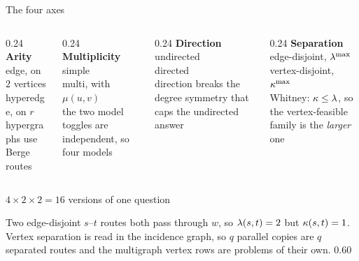 \documentclass[aspectratio=1610,11pt]{beamer}
\begin{document}
\begin{frame}{The four axes}
\vfill
\begin{columns}[T]
\begin{column}{0.24\textwidth}
  {\color{KULblauw1}\bfseries\large Arity}\\[8pt]
  {\small edge, on $2$ vertices}\\
  {\small hyperedge, on $r$}\\[10pt]
  {\scriptsize\color{black!55} hypergraphs use Berge routes}
\end{column}
\begin{column}{0.24\textwidth}
  {\color{KULblauw1}\bfseries\large Multiplicity}\\[8pt]
  {\small simple}\\
  {\small multi, with $\mu(u,v)$}\\[10pt]
  {\scriptsize\color{black!55} the two model toggles are independent, so four models}
\end{column}
\begin{column}{0.24\textwidth}
  {\color{KULblauw1}\bfseries\large Direction}\\[8pt]
  {\small undirected}\\
  {\small directed}\\[10pt]
  {\scriptsize\color{black!55} direction breaks the degree symmetry that caps the undirected answer}
\end{column}
\begin{column}{0.24\textwidth}
  {\color{KULblauw1}\bfseries\large Separation}\\[8pt]
  {\small edge-disjoint, $\lambda^{\max}$}\\
  {\small vertex-disjoint, $\kappa^{\max}$}\\[10pt]
  {\scriptsize\color{black!55} Whitney: $\kappa\le\lambda$, so the vertex-feasible family is the \emph{larger} one}
\end{column}
\end{columns}

\vspace{20pt}
\centering
{\color{KULblauw3b}\large $4 \times 2 \times 2 = 16$ versions of one question}
\vfill
\end{frame}

  {\figedgevertex}
  {Two edge-disjoint $s$--$t$ routes both pass through $w$, so $\lambda(s,t)=2$ but $\kappa(s,t)=1$. Vertex separation is read in the incidence graph, so $q$ parallel copies are $q$ separated routes and the multigraph vertex rows are problems of their own.}
  {0.60}
\end{document}
